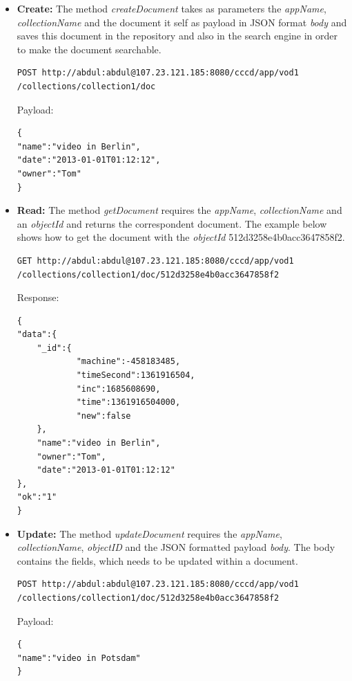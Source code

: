 \begin{itemize}
\item \textbf{Create:} The method \textit{createDocument} takes as parameters  the \textit{appName}, \textit{collectionName} and  the document it self as payload in \ac{JSON} format \textit{body} and saves this document in the repository and also in the search engine in order to make the document searchable.  

\begin{code}
\begin{verbatim}
POST http://abdul:abdul@107.23.121.185:8080/cccd/app/vod1
/collections/collection1/doc
\end{verbatim}
Payload:
\begin{verbatim}
{
"name":"video in Berlin",
"date":"2013-01-01T01:12:12",
"owner":"Tom"
}
\end{verbatim}
\end{code}


\item \textbf{Read:} The method \textit{getDocument} requires the \textit{appName}, \textit{collectionName} and an \textit{objectId} and returns the correspondent document. The example below shows how to get the document with the \textit{objectId} 512d3258e4b0acc3647858f2.

\begin{code}
\begin{verbatim}
GET http://abdul:abdul@107.23.121.185:8080/cccd/app/vod1
/collections/collection1/doc/512d3258e4b0acc3647858f2
\end{verbatim}
Response:
\begin{verbatim}
{
"data":{
	"_id":{
			"machine":-458183485,
			"timeSecond":1361916504,
			"inc":1685608690,
			"time":1361916504000,
			"new":false
	},
	"name":"video in Berlin",
	"owner":"Tom",
	"date":"2013-01-01T01:12:12"
},
"ok":"1"
}
\end{verbatim}
\end{code}

\item \textbf{Update:} The method \textit{updateDocument} requires the \textit{appName}, \textit{collectionName}, \textit{objectID} and the \ac{JSON} formatted payload \textit{body}. The body contains  the fields, which needs to be updated within a document.

\begin{code}
\begin{verbatim}
POST http://abdul:abdul@107.23.121.185:8080/cccd/app/vod1
/collections/collection1/doc/512d3258e4b0acc3647858f2
\end{verbatim}
Payload:
\begin{verbatim}
{
"name":"video in Potsdam"
}
\end{verbatim}
\end{code}


\end{itemize}
